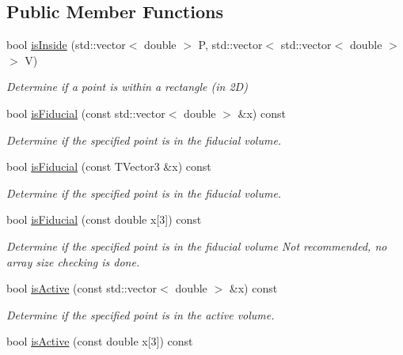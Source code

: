 \subsection*{Public Member Functions}
\begin{DoxyCompactItemize}
\item 
bool \hyperlink{classlee_1_1GeometryHelper_a4d4f0303130ac496452b30f60f43f5f1}{is\-Inside} (std\-::vector$<$ double $>$ P, std\-::vector$<$ std\-::vector$<$ double $>$ $>$ V)
\begin{DoxyCompactList}\small\item\em Determine if a point is within a rectangle (in 2\-D) \end{DoxyCompactList}\item 
bool \hyperlink{classlee_1_1GeometryHelper_a6d02792fc6869b86d850077460536b2a}{is\-Fiducial} (const std\-::vector$<$ double $>$ \&x) const 
\begin{DoxyCompactList}\small\item\em Determine if the specified point is in the fiducial volume. \end{DoxyCompactList}\item 
bool \hyperlink{classlee_1_1GeometryHelper_a5383a8e03c66e9506a75d9afc41f5ff0}{is\-Fiducial} (const T\-Vector3 \&x) const 
\begin{DoxyCompactList}\small\item\em Determine if the specified point is in the fiducial volume. \end{DoxyCompactList}\item 
bool \hyperlink{classlee_1_1GeometryHelper_ae10d0ef387b7573c6cc12565d5bfd0e1}{is\-Fiducial} (const double x\mbox{[}3\mbox{]}) const 
\begin{DoxyCompactList}\small\item\em Determine if the specified point is in the fiducial volume Not recommended, no array size checking is done. \end{DoxyCompactList}\item 
bool \hyperlink{classlee_1_1GeometryHelper_aaa423d79bbb62bdd3337f1d965023baa}{is\-Active} (const std\-::vector$<$ double $>$ \&x) const 
\begin{DoxyCompactList}\small\item\em Determine if the specified point is in the active volume. \end{DoxyCompactList}\item 
bool \hyperlink{classlee_1_1GeometryHelper_ab5c3e840d748f5c5340315b6c096e7c8}{is\-Active} (const double x\mbox{[}3\mbox{]}) const 

\end{DoxyCompactItemize}
